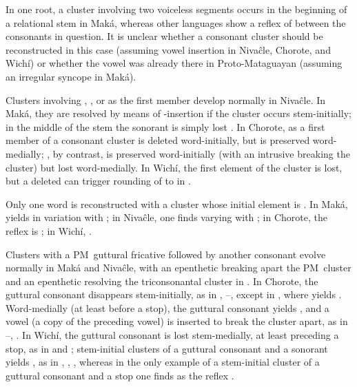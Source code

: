 In one root, a cluster involving two voiceless segments occurs in the beginning of a relational stem in Maká, whereas other languages show a reflex of  between the consonants in question. It is unclear whether a consonant cluster should be reconstructed in this case (assuming vowel insertion in Nivaĉle, Chorote, and Wichí) or whether the vowel was already there in Proto-Mataguayan (assuming an irregular syncope in Maká).

\begin{exe}
    \ex \face
    \ex \eyebrow
\end{exe}

Clusters involving , , or  as the first member develop normally in Nivaĉle. In Maká, they are resolved by means of \mbox{-}insertion if the cluster occurs stem-initially; in the middle of the stem the sonorant is simply lost . In Chorote,  as a first member of a consonant cluster is deleted word-initially, but is preserved word-medially; , by contrast, is preserved word-initially (with an intrusive  breaking the cluster) but lost word-medially. In Wichí, the first element of the cluster is lost, but a deleted  can trigger rounding of  to  in .

\begin{exe}
    \ex \spouse
    \ex \flu
    \ex \squash
    \ex \heartmn \label{wt-heartmn}
    \ex \majan
    \ex \tooth \label{wt-tooth}
    \ex \rib
    \ex \belly
    \ex \metal
\end{exe}

Only one word is reconstructed with a cluster whose initial element is . In Maká,  yields  in variation with  \citep[130]{AG99}; in Nivaĉle, one finds  varying with ; in Chorote, the reflex is ; in Wichí, .

\begin{exe}
    \ex \hurt
\end{exe}

Clusters with a PM~guttural fricative followed by another consonant evolve normally in Maká and Nivaĉle, with an epenthetic  breaking apart the PM~cluster   and an epenthetic  resolving the triconsonantal cluster in . In Chorote, the guttural consonant disappears stem-initially, as in , –, except in , where  yields . Word-medially (at least before a stop), the guttural consonant yields , and a vowel (a copy of the preceding vowel) is inserted to break the cluster apart, as in --, . In Wichí, the guttural consonant is lost stem-medially, at least preceding a stop, as in  and ; stem-initial clusters of a guttural consonant and a sonorant yields , as in , , , whereas in the only example of a stem-initial cluster of a guttural consonant and a stop one finds  as the reflex .

